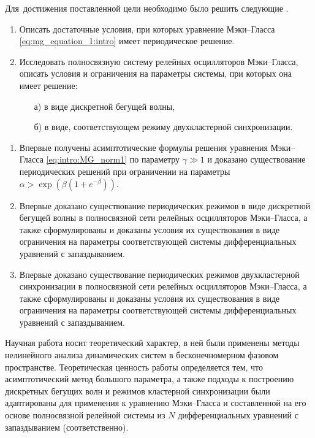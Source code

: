 Для~достижения поставленной цели необходимо было решить следующие {\tasks}.
\begin{enumerate}[beginpenalty=10000] %
	\item Описать достаточные условия, при которых уравнение Мэки--Гласса \eqref{eq:mg_equation_1:intro} имеет периодическое решение.
	\item Исследовать полносвязную систему релейных осцилляторов Мэки--Гласса, описать условия и ограничения на параметры системы, при которых она имеет решение:
	\begin{enumerate}
		\item[а)]в виде дискретной бегущей волны,
		\item[б)]в виде, соответствующем режиму двухкластерной синхронизации.
	\end{enumerate}
\end{enumerate}

\bigskip

{\novelty}
\begin{enumerate}[beginpenalty=10000] %
  \item Впервые получены асимптотические формулы решения уравнения Мэки--Гласса \eqref{eq:intro:MG_norm1} по параметру $\gamma \gg 1$ и доказано существование периодических решений при ограничении на параметры $\alpha > \exp\left(\beta(1 + e^{-\beta})\right)$.
  \item Впервые доказано существование периодических режимов в виде дискретной бегущей волны в полносвязной сети релейных осцилляторов Мэки--Гласса, а также сформулированы и доказаны условия их существования в виде ограничения на параметры соответствующей системы дифференциальных уравнений с запаздыванием.
  \item Впервые доказано существование периодических режимов двухкластерной синхронизации в полносвязной сети релейных осцилляторов Мэки--Гласса, а также сформулированы и доказаны условия их существования в виде ограничения на параметры соответствующей системы дифференциальных уравнений с запаздыванием.
\end{enumerate}

\bigskip

{\influence} Научная работа носит теоретический характер, в ней были применены методы нелинейного анализа динамических систем в бесконечномерном фазовом пространстве. Теоретическая ценность работы определяется тем, что асимптотический метод большого параметра, а также подходы к построению дискретных бегущих волн и режимов кластерной синхронизации были адаптированы для применения к уравнению Мэки--Гласса и составленной на его основе полносвязной релейной системы из $N$ дифференциальных уравнений с запаздыванием (соответственно).

